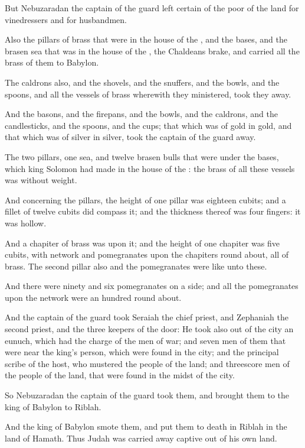 \verse But Nebuzaradan the captain of the guard left certain of the poor of the land for vinedressers and for husbandmen.

\verse Also the pillars of brass that were in the house of the \LORD, and the bases, and the brasen sea that was in the house of the \LORD, the Chaldeans brake, and carried all the brass of them to Babylon.

\verse The caldrons also, and the shovels, and the snuffers, and the bowls, and the spoons, and all the vessels of brass wherewith they ministered, took they away.

\verse And the basons, and the firepans, and the bowls, and the caldrons, and the candlesticks, and the spoons, and the cups; that which was of gold in gold, and that which was of silver in silver, took the captain of the guard away.

\verse The two pillars, one sea, and twelve brasen bulls that were under the bases, which king Solomon had made in the house of the \LORD: the brass of all these vessels was without weight.

\verse And concerning the pillars, the height of one pillar was eighteen cubits; and a fillet of twelve cubits did compass it; and the thickness thereof was four fingers: it was hollow.

\verse And a chapiter of brass was upon it; and the height of one chapiter was five cubits, with network and pomegranates upon the chapiters round about, all of brass. The second pillar also and the pomegranates were like unto these.

\verse And there were ninety and six pomegranates on a side; and all the pomegranates upon the network were an hundred round about.

\verse And the captain of the guard took Seraiah the chief priest, and Zephaniah the second priest, and the three keepers of the door: \verse He took also out of the city an eunuch, which had the charge of the men of war; and seven men of them that were near the king's person, which were found in the city; and the principal scribe of the host, who mustered the people of the land; and threescore men of the people of the land, that were found in the midst of the city.

\verse So Nebuzaradan the captain of the guard took them, and brought them to the king of Babylon to Riblah.

\verse And the king of Babylon smote them, and put them to death in Riblah in the land of Hamath. Thus Judah was carried away captive out of his own land.

